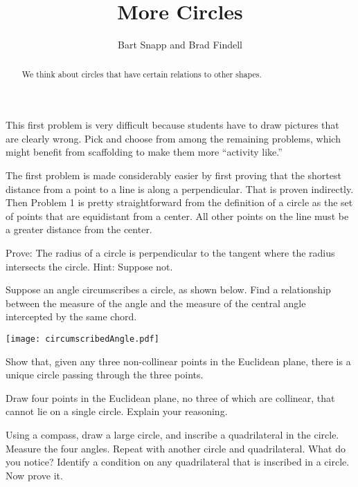 \documentclass[nooutcomes]{ximera}
\title{More Circles}
\author{Bart Snapp and Brad Findell}
\begin{document}
\begin{abstract}
  We think about circles that have certain relations to other shapes.
\end{abstract}
\maketitle

\begin{teachingnote}
This first problem is very difficult because students have to draw pictures that are clearly wrong.  Pick and choose from among the remaining problems, which might benefit from scaffolding to make them more ``activity like.''

The first problem is made considerably easier by first proving that the shortest distance from a point to a line is along a perpendicular.  That is proven indirectly.  Then Problem 1 is pretty straightforward from the definition of a circle as the set of points that are equidistant from a center.  All other points on the line must be a greater distance from the center.
\end{teachingnote}

\begin{problem}
Prove: The radius of a circle is perpendicular to the tangent where the radius intersects the circle.  Hint:  Suppose not. 
\end{problem}

\begin{problem}
Suppose an angle circumscribes a circle, as shown below.  Find a relationship between the measure of the angle and the measure of the central angle intercepted by the same chord.
\begin{image}
\texttt{[image: circumscribedAngle.pdf]}
\end{image}
\end{problem}

\begin{problem}
Show that, given any three non-collinear points in the Euclidean
plane, there is a unique circle passing through the three points.
\end{problem}

\begin{problem}
Draw four points in the Euclidean plane, no three of which are collinear, that cannot lie on a single circle.  Explain your reasoning. 
\end{problem}

\begin{problem}
Using a compass, draw a large circle, and inscribe a quadrilateral in the circle.  Measure the four angles.  Repeat with another circle and quadrilateral.  What do you notice?  Identify a condition on any quadrilateral that is inscribed in a circle.  Now prove it.  
\end{problem}
\end{document}
